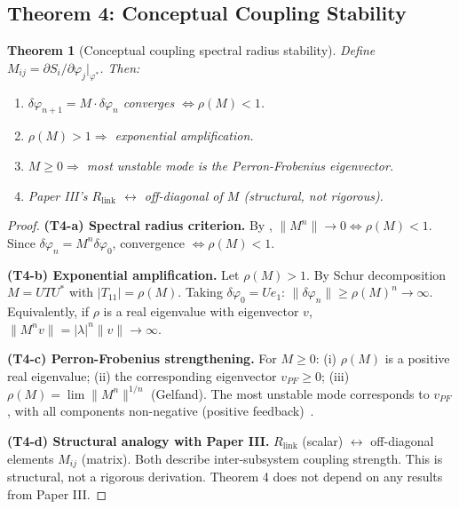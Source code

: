 \documentclass[12pt,a4paper]{article}
\newtheorem{theorem}{Theorem}[section]
\theoremstyle{definition}
\begin{document}
\subsection{Theorem 4: Conceptual Coupling Stability}

\begin{theorem}[Conceptual coupling spectral radius stability]
\label{thm:t4}
Define $M_{ij} = \partial S_i/\partial\varphi_j|_{\varphi^*}$. Then:
\begin{enumerate}[label=(T4-\alph*)]
\item $\delta\varphi_{n+1} = M \cdot \delta\varphi_n$ converges $\iff \rho(M) < 1$.
\item $\rho(M) > 1 \Rightarrow$ exponential amplification.
\item $M \geq 0 \Rightarrow$ most unstable mode is the Perron-Frobenius eigenvector.
\item [Structural analogy] Paper III's $R_{\mathrm{link}}$ $\leftrightarrow$ off-diagonal of $M$ (structural, not rigorous).
\end{enumerate}
\end{theorem}

\begin{proof}
\textbf{(T4-a) Spectral radius criterion.}
By , $\|M^n\| \to 0 \iff \rho(M) < 1$. Since $\delta\varphi_n = M^n \delta\varphi_0$, convergence $\iff \rho(M) < 1$.

\textbf{(T4-b) Exponential amplification.}
Let $\rho(M) > 1$. By Schur decomposition $M = UTU^*$ with $|T_{11}| = \rho(M)$. Taking $\delta\varphi_0 = Ue_1$: $\|\delta\varphi_n\| \geq \rho(M)^n \to \infty$. Equivalently, if $\rho$ is a real eigenvalue with eigenvector $v$, $\|M^n v\| = |\lambda|^n \|v\| \to \infty$.

\textbf{(T4-c) Perron-Frobenius strengthening.}
For $M \geq 0$: (i) $\rho(M)$ is a positive real eigenvalue; (ii) the corresponding eigenvector $v_{PF} \geq 0$; (iii) $\rho(M) = \lim \|M^n\|^{1/n}$ (Gelfand). The most unstable mode corresponds to $v_{PF}$, with all components non-negative (positive feedback)~\cite{HornJohnson2013}.

\textbf{(T4-d) Structural analogy with Paper III.}
$R_{\mathrm{link}}$ (scalar) $\leftrightarrow$ off-diagonal elements $M_{ij}$ (matrix). Both describe inter-subsystem coupling strength. This is structural, not a rigorous derivation. Theorem 4 does not depend on any results from Paper III.
\end{proof}

\end{document}
